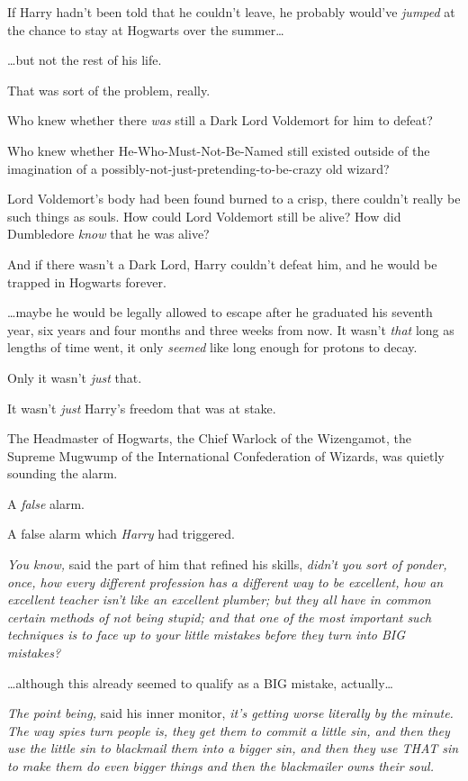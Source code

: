 If Harry hadn't been told that he couldn't leave, he probably would've 
\emph{jumped} at the chance to stay at Hogwarts over the summer{\ldots}

{\ldots}but not the rest of his life.

That was sort of the problem, really.

Who knew whether there \emph{was} still a Dark Lord Voldemort for him to defeat?

Who knew whether He-Who-Must-Not-Be-Named still existed outside of the 
imagination of a possibly-not-just-pretending-to-be-crazy old wizard?

Lord Voldemort's body had been found burned to a crisp, there couldn't really 
be such things as souls. How could Lord Voldemort still be alive? How did 
Dumbledore \emph{know} that he was alive?

And if there wasn't a Dark Lord, Harry couldn't defeat him, and he would be 
trapped in Hogwarts forever.

{\ldots}maybe he would be legally allowed to escape after he graduated his 
seventh year, six years and four months and three weeks from now. It wasn't 
\emph{that} long as lengths of time went, it only \emph{seemed} like long 
enough for protons to decay.

Only it wasn't \emph{just} that.

It wasn't \emph{just} Harry's freedom that was at stake.

The Headmaster of Hogwarts, the Chief Warlock of the Wizengamot, the Supreme 
Mugwump of the International Confederation of Wizards, was quietly sounding the 
alarm.

A \emph{false} alarm.

A false alarm which \emph{Harry} had triggered.

\emph{You know,} said the part of him that refined his skills, \emph{didn't you 
sort of ponder, once, how every different profession has a different way to be 
excellent, how an excellent teacher isn't like an excellent plumber; but they 
all have in common certain methods of not being stupid; and that one of the 
most important such techniques is to face up to your little mistakes before 
they turn into BIG mistakes?}

{\ldots}although this already seemed to qualify as a BIG mistake, 
actually{\ldots}

\emph{The point being,} said his inner monitor, \emph{it's getting worse 
literally by the minute. The way spies turn people is, they get them to commit 
a little sin, and then they use the little sin to blackmail them into a bigger 
sin, and then they use THAT sin to make them do even bigger things and then the 
blackmailer owns their soul.}

